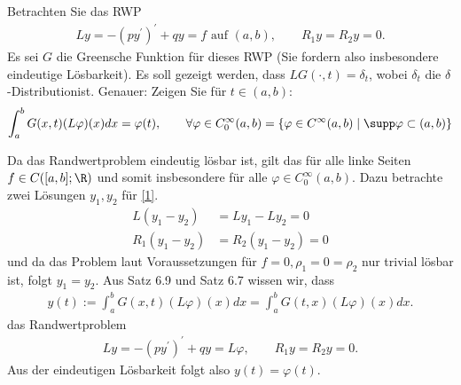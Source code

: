 \begin{exercise}
Betrachten Sie das RWP
\begin{align}\label{1}
  Ly = -(py^{\prime})^{\prime} + qy = f \text{ auf } (a,b), \qquad R_1y = R_2y = 0.
\end{align}
Es sei $G$ die Greensche Funktion für dieses RWP (Sie fordern also insbesondere
eindeutige Lösbarkeit). Es soll gezeigt werden, dass $LG(\cdot,t) = \delta_t$,
wobei $\delta_t$ die \glqq$\delta$-Distribution\grqq ist. Genauer: Zeigen Sie für
$t \in (a,b):$
\begin{align*}
  \int_a^b G(x,t)(L\varphi)(x) dx = \varphi(t), \qquad
  \forall \varphi \in C_0^{\infty}(a,b) = \{\varphi \in C^{\infty}(a,b) \mid \supp \varphi \subset (a,b)\}
\end{align*}
\end{exercise}
\begin{solution}
Da das Randwertproblem eindeutig lösbar ist, gilt das für alle linke Seiten $f \in C([a,b];\R)$
und somit insbesondere für alle $\varphi \in C_0^{\infty}(a,b)$.
Dazu betrachte zwei Lösungen $y_1,y_2$ für \eqref{1}.
\begin{align*}
  L(y_1 - y_2) &= Ly_1 - Ly_2 = 0 \\
  R_1(y_1 - y_2) &= R_2(y_1 - y_2) = 0
\end{align*} und da das Problem laut Voraussetzungen für $f = 0, \rho_1 = 0 = \rho_2$
nur trivial lösbar ist, folgt $y_1 = y_2$.
Aus Satz 6.9 und Satz 6.7 wissen wir, dass
\begin{align*}
  y(t) := \int_a^b G(x,t)(L\varphi)(x) dx = \int_a^b G(t,x)(L\varphi)(x) dx.
\end{align*}
das Randwertproblem
\begin{align*}
  Ly = -(py^{\prime})^{\prime} + qy = L\varphi, \qquad R_1y = R_2y = 0.
\end{align*}
Aus der eindeutigen Lösbarkeit folgt also $y(t) = \varphi(t)$.
\end{solution}
